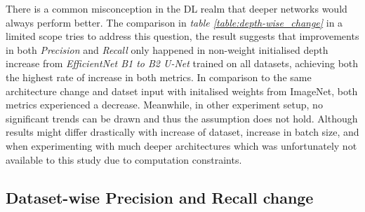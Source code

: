 \documentclass[11pt, a4paper, twoside]{report}
\begin{document}
There is a common misconception in the DL realm that deeper networks would always perform better. The comparison in \textit{table \ref{table:depth-wise_change}} in a limited scope tries to address this question, the result suggests that improvements in both \textit{Precision} and \textit{Recall} only happened in non-weight initialised depth increase from \textit{EfficientNet B1 to B2 U-Net} trained on all datasets, achieving both the highest rate of increase in both metrics. In comparison to the same architecture change and datset input with initalised weights from ImageNet, both metrics experienced a decrease. Meanwhile, in other experiment setup, no significant trends can be drawn and thus the assumption does not hold. Although results might differ drastically with increase of dataset, increase in batch size, and when experimenting with much deeper architectures which was unfortunately not available to this study due to computation constraints.\\\par

\subsection{Dataset-wise Precision and Recall change}\label{data_change}

\begin{table}[H]
  \centering
  \label{table:data-wise_change}
  \caption{Changes when the Dzaleka and Dzaleka North datasets were introduced to each setup.}
\end{table}
\end{document}
